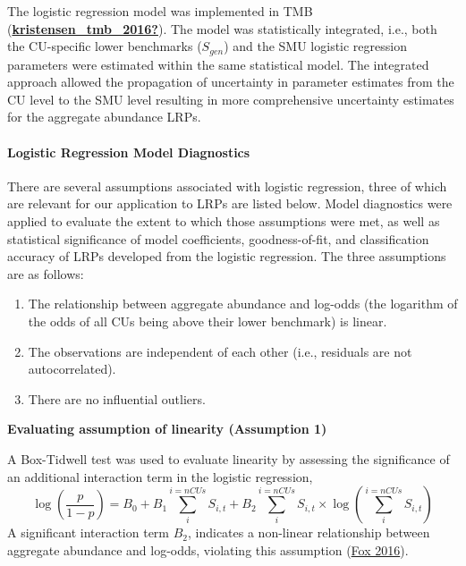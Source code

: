 \documentclass[11pt]{book}
\begin{document}
The logistic regression model was implemented in TMB (\protect\hyperlink{ref-kristensen_tmb_2016}{\textbf{kristensen\_tmb\_2016?}}). The model was statistically integrated, i.e., both the CU-specific lower benchmarks (\(S_{gen}\)) and the SMU logistic regression parameters were estimated within the same statistical model. The integrated approach allowed the propagation of uncertainty in parameter estimates from the CU level to the SMU level resulting in more comprehensive uncertainty estimates for the aggregate abundance LRPs.\\

\hypertarget{logistic-regression-model-diagnostics}{%
\paragraph{Logistic Regression Model Diagnostics}\label{logistic-regression-model-diagnostics}}

There are several assumptions associated with logistic regression, three of which are relevant for our application to LRPs are listed below. Model diagnostics were applied to evaluate the extent to which those assumptions were met, as well as statistical significance of model coefficients, goodness-of-fit, and classification accuracy of LRPs developed from the logistic regression. The three assumptions are as follows:
\begin{enumerate}
\def\labelenumi{\arabic{enumi}.}
\item
  The relationship between aggregate abundance and log-odds (the logarithm of the odds of all CUs being above their lower benchmark) is linear.
\item
  The observations are independent of each other (i.e., residuals are not autocorrelated).
\item
  There are no influential outliers.
\end{enumerate}
\textbf{Evaluating assumption of linearity (Assumption 1)}

A Box-Tidwell test was used to evaluate linearity by assessing the significance of an additional interaction term in the logistic regression,
\begin{equation}
  \log(\frac{p}{1-p}) = B_0 + B_1 \sum_{i}^{i=nCUs} S_{i,t} + B_2 \sum_{i}^{i=nCUs} S_{i,t} \times \log (\sum_{i}^{i=nCUs} S_{i,t})
   \label{eq:BoxTidwelllogistic}
\end{equation}
A significant interaction term \(B_2\), indicates a non-linear relationship between aggregate abundance and log-odds, violating this assumption (\protect\hyperlink{ref-foxAppliedRegressionAnalysis2016}{Fox 2016}).
\end{document}
